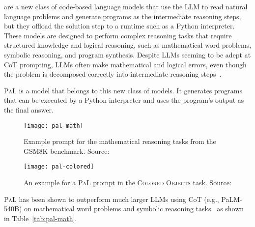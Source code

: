 are a new class of code-based language models that use the LLM to read natural language problems and generate programs as the intermediate reasoning steps, but they offload the solution step to a runtime such as a Python interpreter.
These models are designed to perform complex reasoning tasks that require structured knowledge and logical reasoning, such as mathematical word problems, symbolic reasoning, and program synthesis.
Despite LLMs seeming to be adept at CoT prompting, LLMs often make mathematical and logical errors, even though the problem is decomposed correctly into intermediate reasoning steps~\cite{gao2022pal}.

\textsc{PaL} is a model that belongs to this new class of models.
It generates programs that can be executed by a Python interpreter and uses the program's output as the final answer.
\begin{figure}[h!]
	\centering
	\texttt{[image: pal-math]}
	\caption{Example prompt for the mathematical reasoning tasks from the GSM8K benchmark. Source: \textcite{gao2022pal}}
	\label{fig:pal-math}
\end{figure}
\begin{figure}[h!]
	\centering
	\texttt{[image: pal-colored]}
	\caption{An example for a \textsc{PaL} prompt in the \textsc{Colored Objects} task. Source: \textcite{gao2022pal}}
	\label{fig:pal-colored}
\end{figure}
\textsc{PaL} has been shown to outperform much larger LLMs using CoT (e.g., PaLM-540B) on mathematical word problems and symbolic reasoning tasks~\cite{gao2022pal} as shown in Table~\ref{tab:pal-math}.

